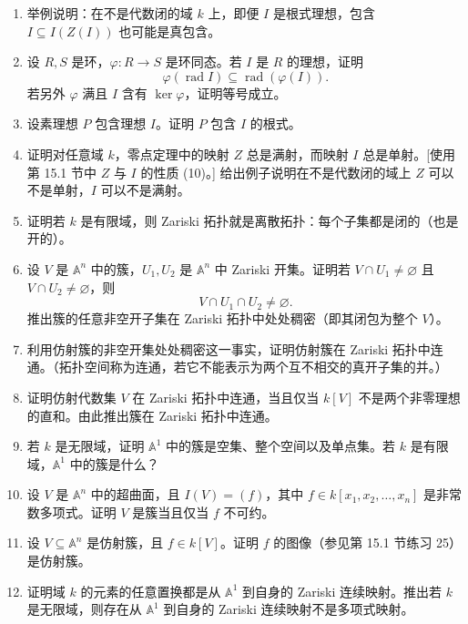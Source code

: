 \begin{enumerate}[label=\arabic*.]
	\item 举例说明：在不是代数闭的域 $k$ 上，即便 $I$ 是根式理想，包含 $I\subseteq I(Z(I))$ 也可能是真包含。
	
	\item 设 $R,S$ 是环，$\varphi:R\to S$ 是环同态。若 $I$ 是 $R$ 的理想，证明
	\[
	\varphi(\operatorname{rad}I)\subseteq\operatorname{rad}(\varphi(I)).
	\]
	若另外 $\varphi$ 满且 $I$ 含有 $\ker\varphi$，证明等号成立。
	
	\item 设素理想 $P$ 包含理想 $I$。证明 $P$ 包含 $I$ 的根式。
	
	\item 证明对任意域 $k$，零点定理中的映射 $Z$ 总是满射，而映射 $I$ 总是单射。[使用第 15.1 节中 $Z$ 与 $I$ 的性质 (10)。] 给出例子说明在不是代数闭的域上 $Z$ 可以不是单射，$I$ 可以不是满射。
	
	\item 证明若 $k$ 是有限域，则 Zariski 拓扑就是离散拓扑：每个子集都是闭的（也是开的）。
	
	\item 设 $V$ 是 $\mathbb A^n$ 中的簇，$U_1,U_2$ 是 $\mathbb A^n$ 中 Zariski 开集。证明若 $V\cap U_1\ne\varnothing$ 且 $V\cap U_2\ne\varnothing$，则
	\[
	V\cap U_1\cap U_2\ne\varnothing.
	\]
	推出簇的任意非空开子集在 Zariski 拓扑中处处稠密（即其闭包为整个 $V$）。
	
	\item 利用仿射簇的非空开集处处稠密这一事实，证明仿射簇在 Zariski 拓扑中连通。（拓扑空间称为连通，若它不能表示为两个互不相交的真开子集的并。）
	
	\item 证明仿射代数集 $V$ 在 Zariski 拓扑中连通，当且仅当 $k[V]$ 不是两个非零理想的直和。由此推出簇在 Zariski 拓扑中连通。
	
	\item 若 $k$ 是无限域，证明 $\mathbb A^1$ 中的簇是空集、整个空间以及单点集。若 $k$ 是有限域，$\mathbb A^1$ 中的簇是什么？
	
	\item 设 $V$ 是 $\mathbb A^n$ 中的超曲面，且 $I(V)=(f)$，其中 $f\in k[x_1,x_2,
	\ldots,x_n]$ 是非常数多项式。证明 $V$ 是簇当且仅当 $f$ 不可约。
	
	\item 设 $V\subseteq\mathbb A^n$ 是仿射簇，且 $f\in k[V]$。证明 $f$ 的图像（参见第 15.1 节练习 25）是仿射簇。
	
	\item 证明域 $k$ 的元素的任意置换都是从 $\mathbb A^1$ 到自身的 Zariski 连续映射。推出若 $k$ 是无限域，则存在从 $\mathbb A^1$ 到自身的 Zariski 连续映射不是多项式映射。
	

\end{enumerate}
